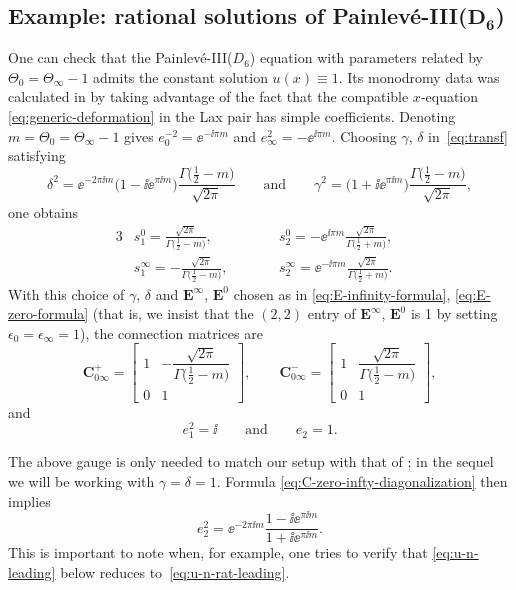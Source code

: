 \subsection[Example: rational solutions of Painlev\'e-III(D\_6)]{Example: rational solutions of Painlev\'e-III($\boldsymbol{D_6}$)}\label{sec:rational-solutions-parameters}
One can check that the Painlev\'e-III($D_6$) equation with parameters related by $\Theta_0=\Theta_\infty-1$ admits the constant solution $u(x)\equiv 1$. Its monodromy data was calculated in \cite[Section 4]{BMS18} by taking advantage of the fact that the compatible $x$-equation \eqref{eq:generic-deformation} in the Lax pair has simple coefficients. Denoting $m=\Theta_0=\Theta_\infty-1$ gives $e_0^{-2}=\ee^{-\ii\pi m}$ and $e_\infty^2=-\ee^{\ii\pi m}$. Choosing $\gamma$, $\delta$ in~\eqref{eq:transf} satisfying
\[ %
\delta^2 = \ee^{-2\pi \ii m} \big(1 - \ii \ee^{\pi \ii m}\big)\dfrac{\Gamma\big(\frac{1}{2} - m\big)}{\sqrt{2\pi}} \qquad \text{and} \qquad \gamma^2 = \big(1 + \ii \ee^{\pi \ii m}\big)\dfrac{\Gamma\big(\frac{1}{2} - m\big)}{\sqrt{2\pi}},
\]
one obtains
 \begin{alignat*}{3}
& s^0_1=\frac{\sqrt{2\pi}}{\Gamma\big(\tfrac{1}{2}-m\big)},\qquad&&
 s^0_2=-\ee^{\ii\pi m}\frac{\sqrt{2\pi}}{\Gamma\big(\tfrac{1}{2}+m\big)},&\\
& s^\infty_1=-\frac{\sqrt{2\pi}}{\Gamma\big(\tfrac{1}{2}-m\big)},\qquad&&
 s^\infty_2=\ee^{-\ii\pi m}\frac{\sqrt{2\pi}}{\Gamma\big(\tfrac{1}{2}+m\big)}.&
 \end{alignat*}
 With this choice of $\gamma$, $\delta$ and $\mathbf{E}^\infty$, $\mathbf{E}^0$ chosen as in \eqref{eq:E-infinity-formula}, \eqref{eq:E-zero-formula} (that is, we insist that the $(2,2)$ entry of $\mathbf{E}^\infty$, $\mathbf{E}^0$ is 1 by setting $\epsilon_0 = \epsilon_\infty = 1$), the connection matrices are
 \begin{equation*}
 \mathbf{C}_{0\infty}^+=\begin{bmatrix}1&-\dfrac{\sqrt{2\pi}}{\Gamma\big(\tfrac{1}{2}-m\big)} \\0&1\end{bmatrix},\qquad\mathbf{C}_{0\infty}^-=\begin{bmatrix}1&\dfrac{\sqrt{2\pi}}{\Gamma\big(\tfrac{1}{2}-m\big)} \\0&1\end{bmatrix},
 \end{equation*}
 and
 \begin{equation*}
 e_1^2=\ii \qquad \text{and} \qquad e_2 = 1.
 \end{equation*}
\begin{Remark}
 The above gauge is only needed to match our setup with that of \cite{BMS18}; in the sequel we will be working with $\gamma = \delta = 1$. Formula \eqref{eq:C-zero-infty-diagonalization} then implies
 \[
 e_2^2 = \ee^{-2\pi \ii m}\dfrac{1 - \ii \ee^{\pi \ii m}}{1 + \ii \ee^{\pi \ii m}}.
 \]
 This is important to note when, for example, one tries to verify that \eqref{eq:u-n-leading} below reduces to~\eqref{eq:u-n-rat-leading}.
\end{Remark}

